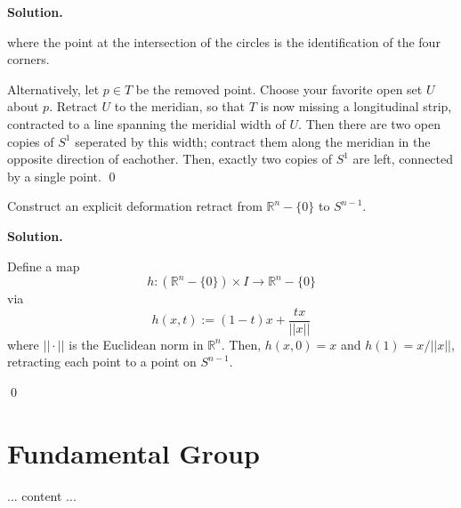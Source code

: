 \documentclass[12pt]{book}
\newcommand{\R}{\mathbb{R}}        %
\theoremstyle{definition}
\newenvironment{solution}
{%
  \par\noindent\textbf{Solution.}\quad
}
{%
  \qed\par
}
\begin{document}
\begin{solution}
\begin{center}
  \end{center}
  where the point at the intersection of the circles is the identification of the four corners.

  Alternatively, let $p \in T$ be the removed point.
  Choose your favorite open set $U$ about $p$.
  Retract $U$ to the meridian, so that $T$ is now missing a longitudinal strip, contracted to  a line spanning the meridial width of $U$.
  Then there are two open copies of $S^1$ seperated by this width; contract them along the meridian in the opposite direction of eachother.
  Then, exactly two copies of $S^1$ are left, connected by a single point.
\end{solution}

\begin{taggedexercise}[\textcolor{red}{TODO}]
  Construct an explicit deformation retract from $\R^n - \{0\}$ to $S^{n-1}$.
\end{taggedexercise}
\begin{solution}
  Define a map 
  \[h: \left(\R^n - \{0\}\right) \times I \to \R^n - \{0\}\]
  via 
  \[h(x, t):= (1-t)x + \frac{tx}{||x||}\]
  where $||\cdot ||$ is the Euclidean norm in $\R^n$.
  Then, $h(x, 0) = x$ and $h(1) = x/||x||$, retracting each point to a point on $S^{n-1}$.

\end{solution}

\chapter{Fundamental Group}

... content ...
\end{document}
